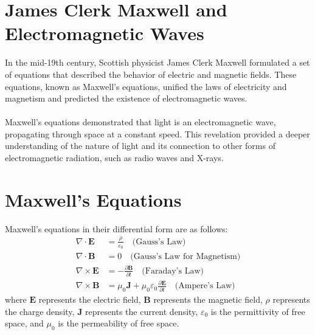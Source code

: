 \documentclass[9pt,a4paper, twocolumn]{article}
\begin{document}
    \section{James Clerk Maxwell and Electromagnetic Waves}
        In the mid-19th century, Scottish physicist James Clerk Maxwell formulated a set of equations that described the behavior of electric and magnetic fields. These equations, known as Maxwell's equations, unified the laws of electricity and magnetism and predicted the existence of electromagnetic waves.
    \\
    \\
        Maxwell's equations demonstrated that light is an electromagnetic wave, propagating through space at a constant speed. This revelation provided a deeper understanding of the nature of light and its connection to other forms of electromagnetic radiation, such as radio waves and X-rays.
    \section{Maxwell's Equations}
        Maxwell's equations in their differential form are as follows:
        \begin{align*}
        \nabla \cdot \mathbf{E} &= \frac{\rho}{\varepsilon_0} \quad \text{(Gauss's Law)} \\
        \nabla \cdot \mathbf{B} &= 0 \quad \text{(Gauss's Law for Magnetism)} \\
        \nabla \times \mathbf{E} &= -\frac{\partial \mathbf{B}}{\partial t} \quad \text{(Faraday's Law)} \\
        \nabla \times \mathbf{B} &= \mu_0 \mathbf{J} + \mu_0\varepsilon_0 \frac{\partial \mathbf{E}}{\partial t} \quad \text{(Ampere's Law)}
        \end{align*}
        where $\mathbf{E}$ represents the electric field, $\mathbf{B}$ represents the magnetic field, $\rho$ represents the charge density, $\mathbf{J}$ represents the current density, $\varepsilon_0$ is the permittivity of free space, and $\mu_0$ is the permeability of free space.
\end{document}
